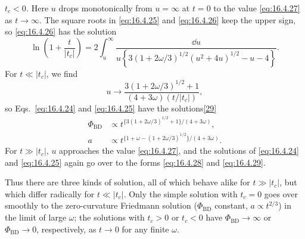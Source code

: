 \emph{\(t_c<0\).} Here \(u\) drops monotonically from \(u=\infty\) at \(t=0\)
to the value \eqref{eq:16.4.27} as \(t\to\infty\). The square roots in
\eqref{eq:16.4.25} and \eqref{eq:16.4.26} keep the upper sign, so
\eqref{eq:16.4.26} has the solution
\[
  \ln\left(1+\frac{t}{\lvert t_c\rvert}\right)
  =
  2\int_u^\infty
  \frac{\dd u}{
    u\left\{
      3(1+2\omega/3)^{1/2}(u^2+4u)^{1/2}
      -u-4
    \right\}
  }.
\]
For \(t\ll\lvert t_c\rvert\), we find
\[
  u\longrightarrow
  \frac{
    3(1+2\omega/3)^{1/2}+1
  }{
    (4+3\omega)(t/\lvert t_c\rvert)
  },
\]
so Eqs.~\eqref{eq:16.4.24} and \eqref{eq:16.4.25} have the
solutions\hyperref[ch16-ref-29]{[29]}
\begin{align}
  \Phi_{\mathrm{BD}}
  &\propto
  t^{\{3(1+2\omega/3)^{1/2}+1\}/(4+3\omega)},
  \tag{16.4.33}\label{eq:16.4.33}\\
  a
  &\propto
  t^{\{1+\omega-(1+2\omega/3)^{1/2}\}/(4+3\omega)}.
  \tag{16.4.34}\label{eq:16.4.34}
\end{align}
For \(t\gg\lvert t_c\rvert\), \(u\) approaches the value
\eqref{eq:16.4.27}, and the solutions of \eqref{eq:16.4.24} and
\eqref{eq:16.4.25} again go over to the forms \eqref{eq:16.4.28} and
\eqref{eq:16.4.29}.

Thus there are three kinds of solution, all of which behave alike for
\(t\gg\lvert t_c\rvert\), but which differ radically for
\(t\ll\lvert t_c\rvert\). Only the simple solution with \(t_c=0\) goes over
smoothly to the zero-curvature Friedmann solution
(\(\Phi_{\mathrm{BD}}\) constant, \(a\propto t^{2/3}\)) in the limit of large
\(\omega\); the solutions with \(t_c>0\) or \(t_c<0\) have
\(\Phi_{\mathrm{BD}}\to\infty\) or \(\Phi_{\mathrm{BD}}\to0\), respectively,
as \(t\to0\) for any finite \(\omega\).

